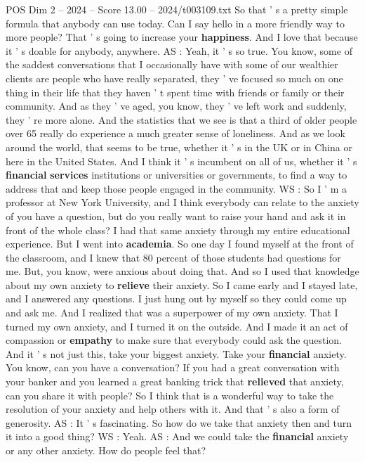\begin{textsample}{POS Dim 2 – 2024 – Score 13.00 – 2024/t003109.txt}
So that ' s a pretty simple formula that anybody can use today.
Can I say hello in a more friendly way to more people?
That ' s going to increase your \textbf{happiness}.
And I love that because it ' s doable for anybody, anywhere.
AS : Yeah, it ' s so true.
You know, some of the saddest conversations that I occasionally have with some of our wealthier clients are people who have really separated, they ' ve focused so much on one thing in their life that they haven ' t spent time with friends or family or their community.
And as they ' ve aged, you know, they ' ve left work and suddenly, they ' re more alone.
And the statistics that we see is that a third of older people over 65 really do experience a much greater sense of loneliness.
And as we look around the world, that seems to be true, whether it ' s in the UK or in China or here in the United States.
And I think it ' s incumbent on all of us, whether it ' s \textbf{financial} \textbf{services} institutions or universities or governments, to find a way to address that and keep those people engaged in the community.
WS : So I ' m a professor at New York University, and I think everybody can relate to the anxiety of you have a question, but do you really want to raise your hand and ask it in front of the whole class?
I had that same anxiety through my entire educational experience.
But I went into \textbf{academia}.
So one day I found myself at the front of the classroom, and I knew that 80 percent of those students had questions for me.
But, you know, were anxious about doing that.
And so I used that knowledge about my own anxiety to \textbf{relieve} their anxiety.
So I came early and I stayed late, and I answered any questions.
I just hung out by myself so they could come up and ask me.
And I realized that was a superpower of my own anxiety.
That I turned my own anxiety, and I turned it on the outside.
And I made it an act of compassion or \textbf{empathy} to make sure that everybody could ask the question.
And it ' s not just this, take your biggest anxiety.
Take your \textbf{financial} anxiety.
You know, can you have a conversation?
If you had a great conversation with your banker and you learned a great banking trick that \textbf{relieved} that anxiety, can you share it with people?
So I think that is a wonderful way to take the resolution of your anxiety and help others with it.
And that ' s also a form of generosity.
AS : It ' s fascinating.
So how do we take that anxiety then and turn it into a good thing?
WS : Yeah.
AS : And we could take the \textbf{financial} anxiety or any other anxiety.
How do people feel that?

\end{textsample}
